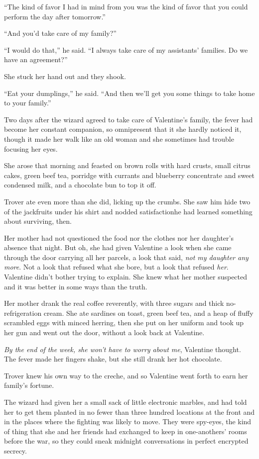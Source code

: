 “The kind of favor I had in mind from you was the kind of favor
that you could perform the day after tomorrow.”

“And you’d take care of my family?”

“I would do that,” he said. “I always take care of my assistants’
families. Do we have an agreement?”

She stuck her hand out and they shook.

“Eat your dumplings,” he said. “And then we’ll get you some things
to take home to your family.”

\tb

Two days after the wizard agreed to take care of Valentine’s
family, the fever had become her constant companion, so omnipresent
that it she hardly noticed it, though it made her walk like an old
woman and she sometimes had trouble focusing her eyes.

She arose that morning and feasted on brown rolls with hard crusts,
small citrus cakes, green beef tea, porridge with currants and
blueberry concentrate and sweet condensed milk, and a chocolate bun
to top it off.

Trover ate even more than she did, licking up the crumbs. She saw
him hide two of the jackfruits under his shirt and nodded
satisfaction\dash{}he had learned something about surviving, then.

Her mother had not questioned the food nor the clothes nor her
daughter’s absence that night. But oh, she had given Valentine a
look when she came through the door carrying all her parcels, a
look that said, \emph{not my daughter any more}. Not a look that
refused what she bore, but a look that refused \emph{her}.
Valentine didn’t bother trying to explain. She knew what her mother
suspected and it was better in some ways than the truth.

Her mother drank the real coffee reverently, with three sugars and
thick no-refrigeration cream. She ate sardines on toast, green beef
tea, and a heap of fluffy scrambled eggs with minced herring, then
she put on her uniform and took up her gun and went out the door,
without a look back at Valentine.

\emph{By the end of the week, she won’t have to worry about me},
Valentine thought. The fever made her fingers shake, but she still
drank her hot chocolate.

Trover knew his own way to the creche, and so Valentine went forth
to earn her family’s fortune.

The wizard had given her a small sack of little electronic marbles,
and had told her to get them planted in no fewer than three hundred
locations at the front and in the places where the fighting was
likely to move. They were spy-eyes, the kind of thing that she and
her friends had exchanged to keep in one-anothers’ rooms before the
war, so they could sneak midnight conversations in perfect
encrypted secrecy.

